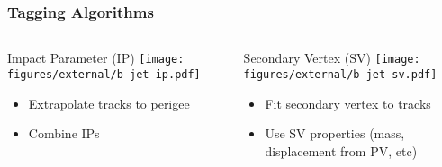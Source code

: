 \documentclass[usenames,dvipsnames]{beamer}
\begin{document}
\begin{frame}
  \frametitle{Tagging Algorithms}
  \begin{columns}[t]
    \begin{column}{0.5\textwidth}
      \begin{center}
        Impact Parameter (IP)
      \texttt{[image: figures/external/b-jet-ip.pdf]}
      \end{center}
      \begin{itemize}
      \item Extrapolate tracks to perigee
      \item Combine IPs
      \end{itemize}
    \end{column}
    \vline{}
    \begin{column}{0.5\textwidth}
      \begin{center}
        Secondary Vertex (SV)
      \texttt{[image: figures/external/b-jet-sv.pdf]}
        \end{center}
      \begin{itemize}
      \item Fit secondary vertex to tracks
      \item Use SV properties (mass, displacement from PV, etc)
      \end{itemize}
    \end{column}
  \end{columns}
\end{frame}
\end{document}
